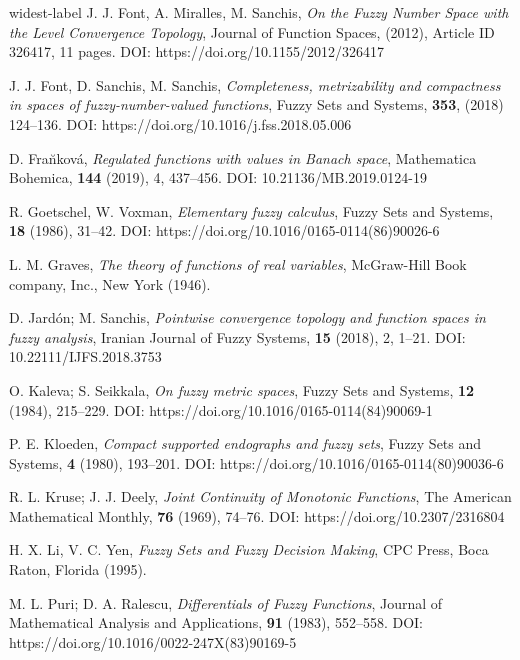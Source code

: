 \documentclass{amsart}
\begin{document}
\begin{thebibliography}{widest-label}
J. J. Font, A. Miralles, M. Sanchis,
\textit{On the Fuzzy Number Space with the Level Convergence Topology},
Journal of Function Spaces,
(2012), Article ID 326417, 11 pages.
DOI:  https://doi.org/10.1155/2012/326417

J. J. Font, D. Sanchis, M. Sanchis,
\textit{Completeness, metrizability and compactness in spaces of fuzzy-number-valued functions},
Fuzzy Sets and Systems,
\textbf{353}, (2018)
{124--136}.
DOI: https://doi.org/10.1016/j.fss.2018.05.006

 D. Fra\u{n}kov\'a,
\textit{Regulated functions with values in Banach space},
Mathematica Bohemica, \textbf{144} (2019), 4, 437--456.
DOI: 10.21136/MB.2019.0124-19

 R. Goetschel, W. Voxman,
\textit{Elementary fuzzy calculus}, Fuzzy Sets and Systems, {\bf 18} (1986),
31--42.
DOI: https://doi.org/10.1016/0165-0114(86)90026-6

L. M. Graves,
\textit{The theory of functions of real variables},
McGraw-Hill Book company, Inc., New York (1946).

 D. Jard\'on; M. Sanchis,  \textit{Pointwise convergence topology and function spaces in fuzzy analysis}, Iranian Journal of Fuzzy Systems, {\bf 15}  (2018), 2, 1--21.
DOI: 10.22111/IJFS.2018.3753

 O. Kaleva; S. Seikkala,  \textit{On fuzzy metric spaces}, Fuzzy Sets and Systems, {\bf 12}  (1984), 215--229.
DOI: https://doi.org/10.1016/0165-0114(84)90069-1

 P. E. Kloeden,  \textit{Compact supported endographs and fuzzy sets}, Fuzzy Sets and Systems, {\bf 4}  (1980), 193--201.
DOI: https://doi.org/10.1016/0165-0114(80)90036-6

 R. L. Kruse; J. J. Deely,  \textit{Joint Continuity of Monotonic Functions}, The American Mathematical Monthly, {\bf 76}  (1969), 74--76.
DOI: https://doi.org/10.2307/2316804


H. X. Li,  V. C. Yen, \textit{Fuzzy Sets and Fuzzy Decision
Making}, CPC Press, Boca Raton, Florida (1995).

 M. L. Puri; D. A. Ralescu,  \textit{Differentials of Fuzzy Functions}, Journal of Mathematical Analysis and Applications, {\bf 91}  (1983), 552--558.
DOI: https://doi.org/10.1016/0022-247X(83)90169-5


\end{thebibliography}
\end{document}
